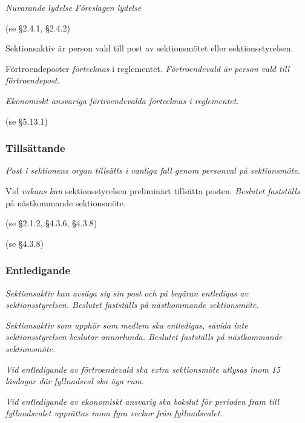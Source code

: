 \documentclass{article}
\newenvironment{lydelse}
    {\begin{paracol}{2}%
        \emph{Nuvarande lydelse}%
        \switchcolumn%
        \emph{Föreslagen lydelse}%
    \end{paracol}%
    \begin{enumerate}[label=\thesubsection.\arabic*]%
    \begin{paracol}{2}%
    }{\end{paracol}\end{enumerate}}
\begin{document}
\begin{lydelse}
    (se \S 2.4.1, \S 2.4.2)
  
  \switchcolumn
    \item Sektionsaktiv är person vald till post av sektionsmötet eller sektionsstyrelsen.
      \label{4.x:aktiv}
  
    \item Förtroendeposter \emph{förtecknas} i reglementet.
    \emph{Förtroendevald är person vald till förtroendepost.}
      \label{4.x:fortroende}

    \item \emph{Ekonomiskt ansvariga förtroendevalda förtecknas i reglementet.}

  \switchcolumn*
    (se \S 5.13.1)
  \switchcolumn
    \subsubsection*{Tillsättande}
    \item \emph{Post i sektionens organ tillsätts i vanliga fall genom personval på sektionsmöte.}

    \item Vid \emph{vakans kan} sektionsstyrelsen preliminärt tillsätta posten.
    \emph{Beslutet fastställs} på nästkommande sektionsmöte.

  \switchcolumn*
    \item[] (se \S 2.1.2, \S 4.3.6, \S 4.3.8)
    \item[] (se \S 4.3.8)
  
  \switchcolumn
    \subsubsection*{Entledigande}
    \item \emph{Sektionsaktiv kan avsäga sig sin post och på begäran entledigas av sektionsstyrelsen.
    Beslutet fastställs på nästkommande sektionsmöte.}

    \item \emph{Sektionsaktiv som upphör som medlem ska entledigas, såvida inte sektionsstyrelsen beslutar annorlunda.
    Beslutet fastställs på nästkommande sektionsmöte.}
      \label{4.x:kvarstå}

    \item \emph{Vid entledigande av förtroendevald ska extra sektionsmöte utlysas inom 15 läsdagar där fyllnadsval ska äga rum}.

    \item \emph{Vid entledigande av ekonomiskt ansvarig ska bokslut för perioden fram till fyllnadsvalet upprättas inom fyra veckor från fyllnadsvalet.}
      \label{4.2:enteko}
    
\end{lydelse}
\end{document}
